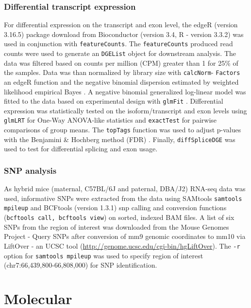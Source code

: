 \subsubsection{Differential transcript expression}
For differential expression on the transcript and exon level, the edgeR \cite{Chen2014,Robinson2009} (version 3.16.5) package download from Bioconductor \cite{Anders2013,Huber2015} (version 3.4, R \cite{Rcite2016} - version 3.3.2) was used in conjunction with \texttt{featureCounts}. The \texttt{featureCounts} produced read counts were used to generate an \texttt{DGEList} object for downstream analysis. The data was filtered based on counts per million (CPM) greater than 1 for 25\% of the samples. Data was than normalized by library size with \texttt{calcNorm}- \texttt{Factors} an edgeR function and the negative binomial dispersion estimated by weighted likelihood empirical Bayes \cite{Chen2014,Phipson2016}. A negative binomial generalized log-linear model was fitted to the data based on experimental design with \texttt{glmFit} \cite{McCarthy2012}. Differential expression was statistically tested on the isoform/transcript and exon levels using \texttt{glmLRT} \cite{McCarthy2012} for One-Way ANOVA-like statistics and \texttt{exactTest} \cite{Robinson2007b} for pairwise comparisons of group means. The \texttt{topTags} function \cite{Robinson2007b,Robinson2007a} was used to adjust p-values with the Benjamini \& Hochberg method (FDR) \cite{BH_1995}. Finally, \texttt{diffSpliceDGE} was used to test for differential splicing and exon usage.

\subsubsection{SNP analysis}
As hybrid mice (maternal, C57BL/6J and paternal, DBA/J2) RNA-seq data was used, informative SNPs were extracted from the data using SAMtools \texttt{samtools mpileup} and BCFtools (version 1.3.1) snp calling and conversion functions (\texttt{bcftools call, bcftools view}) on sorted, indexed BAM files. A list of six SNPs from the region of interest was downloaded from the Mouse Genomes Project - Query SNPs \cite{Keane2011,Yalcin2011} after conversion of mm9 genomic coordinates to mm10 via LiftOver - an UCSC tool (\url{http://genome.ucsc.edu/cgi-bin/hgLiftOver}). The \texttt{-r} option for \texttt{samtools mpileup} was used to specify region of interest (chr7:66,439,800-66,808,000) for SNP identification.

\section*{Molecular}
